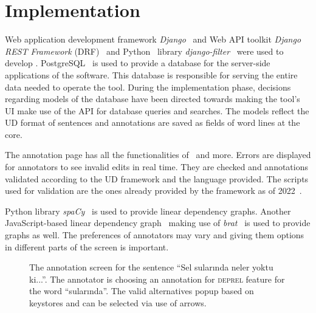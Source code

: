 \section{Implementation}
\label{sec:implementation}

Web application development framework \textit{Django}~\cite{django} and Web API toolkit \textit{Django REST Framework} (DRF)~\cite{drf} and Python~\cite{python} library \textit{django-filter}~\cite{django-filter} were used to develop \boatvtwo.
PostgreSQL~\cite{psql} is used to provide a database for the server-side applications of the software.
This database is responsible for serving the entire data needed to operate the tool.
During the implementation phase, decisions regarding models of the database have been directed towards making the tool's UI make use of the API for database queries and searches.
The models reflect the UD format of sentences and annotations are saved as fields of word lines at the core.

The annotation page has all the functionalities of \boatvone\ and more.
Errors are displayed for annotators to see invalid edits in real time.
They are checked and annotations validated according to the UD framework and the language provided.
The scripts used for validation are the ones already provided by the framework as of 2022~\cite{UD-git}.

Python library \textit{spaCy}~\cite{spacy} is used to provide linear dependency graphs.
Another JavaScript-based linear dependency graph~\cite{spyssalo} making use of \textit{brat}~\cite{brat-vis} is used to provide graphs as well.
The preferences of annotators may vary and giving them options in different parts of the screen is important.

\begin{figure}[tbh]
    \centering
    \caption{The annotation screen for the sentence ``Sel sularında neler yoktu ki...''. The annotator is choosing an annotation for \textsc{deprel} feature for the word ``sularında''. The valid alternatives popup based on keystores and can be selected via use of arrows. }
    \label{fig:demo-fig}
\end{figure}


